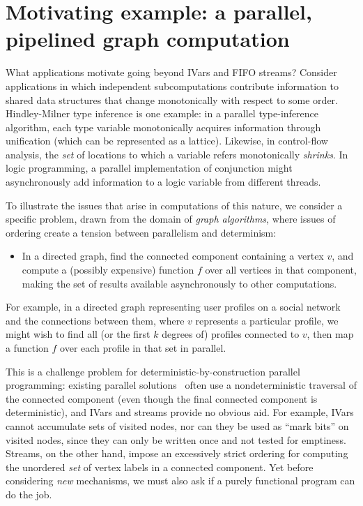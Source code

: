 \section{Motivating example: a parallel, pipelined graph computation}\label{s:lvars-motivation}

What applications motivate going beyond IVars and FIFO streams?
Consider applications in which independent subcomputations contribute
information to shared data structures that change monotonically with
respect to some order.  Hindley-Milner type inference is one example:
in a parallel type-inference algorithm, each type variable
monotonically acquires information through unification (which can be
represented as a lattice). Likewise, in control-flow analysis, the
\emph{set} of locations to which a variable refers monotonically
\emph{shrinks}.  In logic programming, a parallel implementation of
conjunction might asynchronously add information to a logic variable
from different threads.

To illustrate the issues that arise in computations of this nature, we
consider a specific problem, drawn from the domain of {\em graph
  algorithms}, where issues of ordering create a tension between
parallelism and determinism:
\begin{itemize}
\item 
  In a directed graph, find the connected component containing a
  vertex $v$, and compute a (possibly expensive) function $f$ over all
  vertices in that component, making the set of results available
  asynchronously to other computations.
\end{itemize}
For example, in a directed graph representing user profiles on a
social network and the connections between them, where $v$ represents
a particular profile, we might wish to find all (or the first $k$
degrees of) profiles connected to $v$, then map a function $f$ over
each profile in that set in parallel.

This is a challenge problem for deterministic-by-construction parallel
programming: existing parallel solutions~\cite{bfs-pbgl} often use a
nondeterministic traversal of the connected component (even though the
final connected component is deterministic), and IVars and streams
provide no obvious aid.  For example, IVars cannot accumulate sets of
visited nodes, nor can they be used as ``mark bits'' on visited nodes,
since they can only be written once and not tested for emptiness.
Streams, on the other hand, impose an excessively strict ordering for
computing the unordered \emph{set} of vertex labels in a connected
component.  Yet before considering \emph{new} mechanisms, we must also
ask if a purely functional program can do the job.

